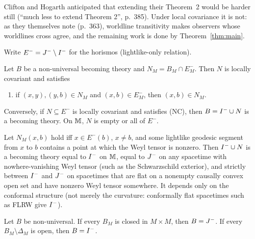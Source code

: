 Clifton and Hogarth anticipated that extending their Theorem~2 would be
harder still (``much less to extend Theorem 2'', p.~385). Under local
covariance it is not: as they themselves note (p.~363), worldline transitivity
makes observers whose worldlines cross agree, and the remaining work is done by
Theorem~\ref{thm:main}.

Write $E^-=J^{-}\setminus I^{-}$ for the horismos (lightlike-only relation).

\begin{theorem}\label{thm:class}
Let $B$ be a non-universal becoming theory and $N_M=B_M\cap E^-_M$. Then $N$
is locally covariant and satisfies
\begin{enumerate}
\item[(NC)] if $(x,y),(y,b)\in N_M$ and $(x,b)\in E^-_M$, then $(x,b)\in N_M$.
\end{enumerate}
Conversely, if $N\subseteq E^-$ is locally covariant and satisfies (NC), then
$B=I^{-}\cup N$ is a becoming theory. On $\mathbb M$, $N$ is empty or all of $E^-$.
\end{theorem}

\begin{theorem}\label{thm:weyl}
Let $N_M(x,b)$ hold iff $x\in E^-(b)$, $x\neq b$, and some lightlike geodesic
segment from $x$ to $b$ contains a point at which the Weyl tensor is nonzero.
Then $I^{-}\cup N$ is a becoming theory equal to $I^{-}$ on $\mathbb M$, equal to
$J^{-}$ on any spacetime with nowhere-vanishing Weyl tensor (such as the
Schwarzschild exterior), and strictly between $I^{-}$ and $J^{-}$ on spacetimes
that are flat on a nonempty causally convex open set and have nonzero Weyl
tensor somewhere. It depends only on the conformal structure (not merely the
curvature: conformally flat spacetimes such as FLRW give $I^{-}$).
\end{theorem}

\begin{proposition}[Regularity]\label{prop:reg}
Let $B$ be non-universal. If every $B_M$ is closed in $M\times M$, then
$B=J^{-}$. If every $B_M\setminus\Delta_M$ is open, then $B=I^{-}$.
\end{proposition}
